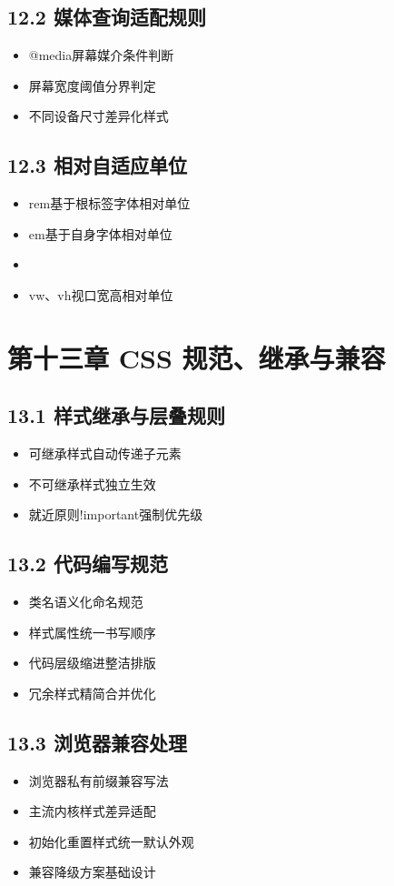 \subsection{12.2 媒体查询适配规则}
\begin{itemize}[leftmargin=*]
\item @media屏幕媒介条件判断
\item 屏幕宽度阈值分界判定
\item 不同设备尺寸差异化样式
\end{itemize}

\subsection{12.3 相对自适应单位}
\begin{itemize}[leftmargin=*]
\item rem基于根标签字体相对单位
\item em基于自身字体相对单位
\item %
\item vw、vh视口宽高相对单位
\end{itemize}

\section{第十三章 CSS 规范、继承与兼容}
\subsection{13.1 样式继承与层叠规则}
\begin{itemize}[leftmargin=*]
\item 可继承样式自动传递子元素
\item 不可继承样式独立生效
\item 就近原则!important强制优先级
\end{itemize}

\subsection{13.2 代码编写规范}
\begin{itemize}[leftmargin=*]
\item 类名语义化命名规范
\item 样式属性统一书写顺序
\item 代码层级缩进整洁排版
\item 冗余样式精简合并优化
\end{itemize}

\subsection{13.3 浏览器兼容处理}
\begin{itemize}[leftmargin=*]
\item 浏览器私有前缀兼容写法
\item 主流内核样式差异适配
\item 初始化重置样式统一默认外观
\item 兼容降级方案基础设计
\end{itemize}
